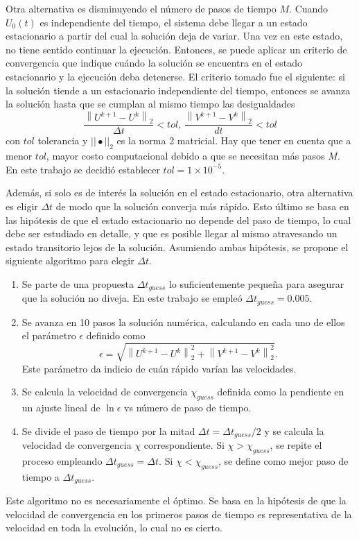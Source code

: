\documentclass[aps,prb,twocolumn,superscriptaddress,floatfix,longbibliography,10pt]{revtex4-2}
\newif\ifptitle
\newif\ifpnumber
\newcounter{para}
\newcommand\ptitle[1]{\par\refstepcounter{para}
{\ifpnumber{\noindent\textcolor{lightgray}{\textbf{\thepara}}\indent}\fi}
{\ifptitle{\textbf{[{#1}]}}\fi}}
\begin{document}
\ptitle{Elección de $M$}
Otra alternativa es disminuyendo el número de pasos de tiempo $M$. Cuando $U_0(t)$ es independiente del tiempo, el sistema debe llegar a un estado estacionario a partir del cual la solución deja de variar. Una vez en este estado, no tiene sentido continuar la ejecución. Entonces, se puede aplicar un criterio de convergencia que indique cuándo la solución se encuentra en el estado estacionario y la ejecución deba detenerse. El criterio tomado fue el siguiente: si la solución tiende a un estacionario independiente del tiempo, entonces se avanza la solución hasta que se cumplan al mismo tiempo las desigualdades
\[\frac{\left \|U^{k+1}-U^k \right \|_2}{\Delta t} < tol, \, \frac{\left \| V^{k+1} - V^k \right \|_2}{dt} < tol \]
con $tol$ tolerancia y $|| \bullet ||_2$ es la norma 2 matricial. Hay que tener en cuenta que a menor $tol$, mayor costo computacional debido a que se necesitan más pasos $M$. En este trabajo se decidió establecer $tol = 1 \times 10^{-5}$.
\ptitle{Algoritmo para $\Delta t$}

Además, si solo es de interés la solución en el estado estacionario, otra alternativa es eligir $\Delta t$ de modo que la solución converja más rápido. Esto último se basa en las hipótesis de que el estado estacionario no depende del paso de tiempo, lo cual debe ser estudiado en detalle, y que es posible llegar al mismo atravesando un estado transitorio lejos de la solución. Asumiendo ambas hipótesis, se propone el siguiente algoritmo para elegir $\Delta t$.
\begin{enumerate}
  \item Se parte de una propuesta $\Delta t_{guess}$ lo suficientemente pequeña para asegurar que la solución no diveja. En este trabajo se empleó $\Delta t_{guess} = 0.005.$ 
  \item Se avanza en 10 pasos la solución numérica, calculando en cada uno de ellos el parámetro $\epsilon$ definido como
  \[\epsilon = \sqrt{ \left \|U^{k+1}-U^k \right \|_2^2 +  \left \| V^{k+1} - V^k \right \|_2^2 }.\]
  Este parámetro da indicio de cuán rápido varían las velocidades.
  \item Se calcula la velocidad de convergencia $\chi_{guess}$ definida como la pendiente en un ajuste lineal de $\ln{\epsilon}$ vs número de paso de tiempo.
  \item Se divide el paso de tiempo por la mitad $\Delta t = \Delta t_{guess}/2$ y se calcula la velocidad de convergencia $\chi$ correspondiente. Si $\chi > \chi_{guess}$, se repite el proceso empleando $ \Delta t_{guess} = \Delta t$. Si $\chi < \chi_{guess}$, se define como mejor paso de tiempo a $\Delta t_{guess}$.
\end{enumerate}
Este algoritmo no es necesariamente el óptimo. Se basa en la hipótesis de que la velocidad de convergencia en los primeros pasos de tiempo es representativa de la velocidad en toda la evolución, lo cual no es cierto.
\end{document}
